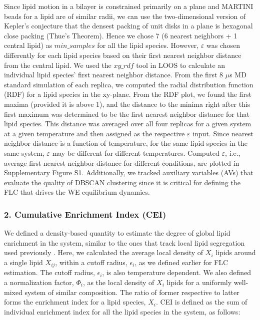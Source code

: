 \documentclass{biophys-new}
\begin{document}
Since lipid motion in a bilayer is constrained primarily on a plane and MARTINI beads for a lipid are of similar radii, we can use the two-dimensional version of Kepler's conjecture that the densest packing of unit disks in a plane is hexagonal close packing (Thue's Theorem).
Hence we chose 7 (6 nearest neighbors + 1 central lipid) as $min\_samples$ for all the lipid species.
However, $\varepsilon$ was chosen differently for each lipid species based on their first nearest neighbor distance from the central lipid.
We used the $xy\_rdf$ tool in LOOS to calculate an individual lipid species' first nearest neighbor distance.
From the first 8 $\mu$s MD standard simulation of each replica, we computed the radial distribution function (RDF) for a lipid species in the xy-plane. 
From the RDF plot, we found the first maxima (provided it is above 1), and the distance to the minima right after this first maximum was determined to be the first nearest neighbor distance for that lipid species.
This distance was averaged over all four replicas for a given system at a given temperature and then assigned as the respective $\varepsilon$ input.
Since nearest neighbor distance is a function of temperature, for the same lipid species in the same system, $\varepsilon$ may be different for different temperatures.
Computed $\varepsilon$, i.e., average first nearest neighbor distance for different conditions, are plotted in Supplementary Figure S1.
Additionally, we tracked auxiliary variables (AVs) that evaluate the quality of DBSCAN clustering since it is critical for defining the FLC that drives the WE equilibrium dynamics.

\subsubsection*{2. Cumulative Enrichment Index (CEI)}

We defined a density-based quantity to estimate the degree of global lipid enrichment in the system, similar to the ones that track local lipid segregation used previously \cite{Gu2019, Gu2020}.
Here, we calculated the average local density of $X_i$ lipids around a single lipid $X_{ij}$, within a cutoff radius, $\epsilon_i$, as we defined earlier for FLC estimation.
The cutoff radius, $\epsilon_i$, is also temperature dependent.
We also defined a normalization factor, $\Phi_i$, as the local density of $X_i$ lipids for a uniformly well-mixed system of similar composition.
The ratio of former respective to latter forms the enrichment index for a lipid species, $X_i$.
CEI is defined as the sum of individual enrichment index for all the lipid species in the system, as follows:
\end{document}
